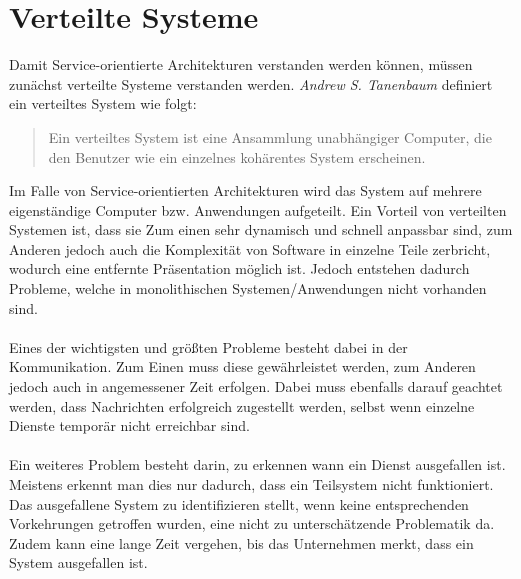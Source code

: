 \section{Verteilte Systeme}
\label{sec:VerteilteAnwendungen}
Damit Service-orientierte Architekturen verstanden werden können, müssen zunächst verteilte Systeme verstanden werden. \textit{Andrew S. Tanenbaum} definiert ein verteiltes System wie folgt:
\begin{quotation}
    \frqq Ein verteiltes System ist eine Ansammlung unabhängiger Computer, die den Benutzer wie ein einzelnes kohärentes System erscheinen.\flqq\cite[S. 19]{tanenbaum:VerteilteSysteme}
\end{quotation}
Im Falle von Service-orientierten Architekturen wird das System auf mehrere eigenständige Computer bzw. Anwendungen aufgeteilt. Ein Vorteil von verteilten Systemen ist, dass sie Zum einen sehr dynamisch und schnell anpassbar sind, zum Anderen jedoch auch die Komplexität von Software in einzelne Teile zerbricht, wodurch eine entfernte Präsentation möglich ist.
Jedoch entstehen dadurch Probleme, welche in monolithischen Systemen/Anwendungen nicht vorhanden sind.
\\\\
Eines der wichtigsten und größten Probleme besteht dabei in der Kommunikation. Zum Einen muss diese gewährleistet werden, zum Anderen jedoch auch in angemessener Zeit erfolgen. Dabei muss ebenfalls darauf geachtet werden, dass Nachrichten erfolgreich zugestellt werden, selbst wenn einzelne Dienste temporär nicht erreichbar sind.
\\\\
Ein weiteres Problem besteht darin, zu erkennen wann ein Dienst ausgefallen ist. Meistens erkennt man dies nur dadurch, dass ein Teilsystem nicht funktioniert. Das ausgefallene System zu identifizieren stellt, wenn keine entsprechenden Vorkehrungen getroffen wurden, eine nicht zu unterschätzende Problematik da. Zudem kann eine lange Zeit vergehen, bis das Unternehmen merkt, dass ein System ausgefallen ist. 

